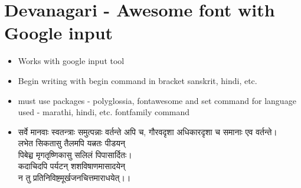 \documentclass{article}
\begin{document}
\section{Devanagari - Awesome font with Google input}
\begin{Large}
    \begin{itemize}
        \item Works with google input tool
        \item Begin writing with begin command in bracket sanskrit, hindi, etc.
        \item must use packages - polyglossia, fontawesome and set command for language used - marathi, hindi, etc. fontfamily command
        \item \begin{sanskrit}
\scriptsize {सर्वे मानवाः स्वतन्त्राः समुत्पन्नाः वर्तन्ते अपि च, गौरवदृशा अधिकारदृशा च समानाः एव वर्तन्ते।}\\
\small लभेत सिकतासु तैलमपि यत्नतः पीडयन्\\
\large पिबेच्च मृगतृष्णिकासु सलिलं पिपासार्दितः।\\
\Large कदाचिदपि पर्यटन् शशविषाणमासादयेन्\\
\huge न तु प्रतिनिविष्टमूर्खजनचित्तमाराधयेत्।।
\end{sanskrit}
    \end{itemize}
\end{Large}
\pagebreak
\end{document}
